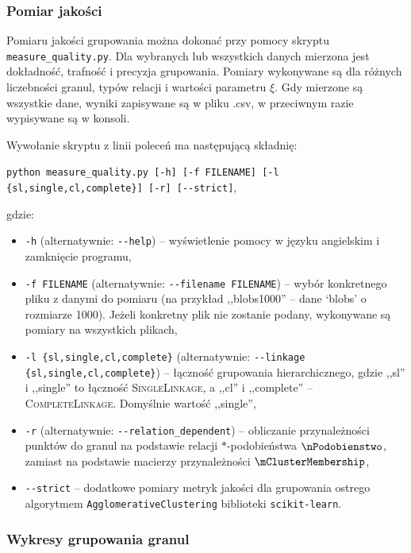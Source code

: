 \documentclass[a4paper,twoside,12pt]{book}
\newcommand{\dataset}[1]{`#1'}
\newcommand{\blobs}{\dataset{blobs}}
\newcommand{\procedura}[1]{\textsc{#1}}
\newcommand{\SingleLinkage}{\procedura{Si\-ng\-le\-Lin\-ka\-ge}}
\newcommand{\CompleteLinkage}{\procedura{Com\-ple\-te\-Lin\-ka\-ge}}
\begin{document}
\begin{appendices}
\subsubsection*{Pomiar jakości}

Pomiaru jakości grupowania można dokonać przy pomocy skryptu \lstinline|measure_quality.py|. Dla wybranych lub wszystkich danych mierzona jest dokładność, trafność i precyzja grupowania. Pomiary wykonywane są dla różnych liczebności granul, typów relacji i wartości parametru $\xi$. Gdy mierzone są wszystkie dane, wyniki zapisywane są w pliku .csv, w przeciwnym razie wypisywane są w konsoli.

Wywołanie skryptu z linii poleceń ma następującą składnię:

\lstinline|python measure_quality.py [-h] [-f FILENAME] [-l {sl,single,cl,complete}] [-r] [--strict]|,

\noindent gdzie:

\begin{itemize}
	\item \lstinline|-h| (alternatywnie: \lstinline|--help|) -- wyświetlenie pomocy w języku angielskim i zamknięcie programu,
	\item \lstinline|-f FILENAME| (alternatywnie: \lstinline|--filename FILENAME|) -- wybór konkretnego pliku z danymi do pomiaru (na przykład ,,blobs1000'' -- dane \blobs{} o rozmiarze 1000). Jeżeli konkretny plik nie zostanie podany, wykonywane są pomiary na wszystkich plikach,
	\item \lstinline|-l {sl,single,cl,complete}| (alternatywnie: \lstinline|--linkage {sl,single,cl,complete}|) -- łączność grupowania hierarchicznego, gdzie ,,sl'' i ,,single'' to łączność \SingleLinkage{}, a ,,cl'' i ,,complete'' -- \CompleteLinkage{}. Domyślnie wartość ,,single'',
	\item \lstinline|-r| (alternatywnie: \lstinline|--relation_dependent|) -- obliczanie przynależności punktów do granul na podstawie relacji $\ast$-podobieństwa $\nPodobienstwo$, zamiast na podstawie macierzy przynależności $\mClusterMembership$,
	\item \lstinline|--strict| -- dodatkowe pomiary metryk jakości dla grupowania ostrego algorytmem \texttt{Ag\-glo\-me\-ra\-ti\-ve\-Clu\-s\-te\-ring} biblioteki \texttt{scikit-learn}.
\end{itemize}

\subsubsection*{Wykresy grupowania granul}


\end{appendices}
\end{document}
